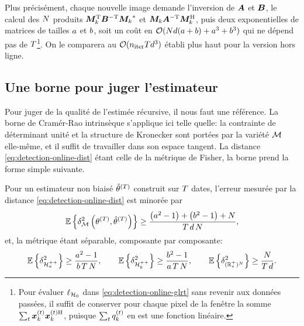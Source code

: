 Plus précisément, chaque nouvelle image demande l'inversion de $\boldsymbol{A}$ et $\boldsymbol{B}$, le calcul des $N$ produits $\boldsymbol{M}_k^{\mathrm{T}}\boldsymbol{B}^{-\mathrm{T}}{\boldsymbol{M}_k}^{*}$ et $\boldsymbol{M}_k\boldsymbol{A}^{-\mathrm{T}}\boldsymbol{M}_k^{\mathrm{H}}$, puis deux exponentielles de matrices de tailles $a$ et $b$, soit un coût en $\mathcal{O}(Nd(a+b)+a^3+b^3)$ qui ne dépend pas de $T$\footnote{Pour évaluer $\ell_{\mathcal{H}_0}$ dans \cref{eq:detection-online-glrt} sans revenir aux données passées, il suffit de conserver pour chaque pixel de la fenêtre la somme $\sum_{t}\boldsymbol{x}_k^{(t)}\boldsymbol{x}_k^{(t)\mathrm{H}}$, puisque $\sum_t q_k^{(t)}$ en est une fonction linéaire.}. On le comparera au $\mathcal{O}(n_{\mathrm{iter}}Td^3)$ établi plus haut pour la version hors ligne.

\subsection{Une borne pour juger l'estimateur}

Pour juger de la qualité de l'estimée récursive, il nous faut une référence. La borne de Cramér-Rao intrinsèque s'applique ici telle quelle: la contrainte de déterminant unité et la structure de Kronecker sont portées par la variété $\mathcal{M}$ elle-même, et il suffit de travailler dans son espace tangent. La distance \cref{eq:detection-online-dist} étant celle de la métrique de Fisher, la borne prend la forme simple suivante.

\begin{proposition}
\label{prop:detection-online-icrb}
  Pour un estimateur non biaisé $\hat{\theta}^{(T)}$ construit sur $T$ dates, l'erreur mesurée par la distance \cref{eq:detection-online-dist} est minorée par
  \begin{equation}
    \operatorname{\mathbb{E}}\left\{\delta^2_{\mathcal{M}}\left(\theta^{(T)},\hat{\theta}^{(T)}\right)\right\}
    \geq
    \frac{\left(a^2-1\right)+\left(b^2-1\right)+N}{T\,d\,N},
    \label{eq:detection-online-icrb}
  \end{equation}
  et, la métrique étant séparable, composante par composante:
  \begin{equation}
    \operatorname{\mathbb{E}}\left\{\delta^2_{\mathcal{H}_{a}^{++}}\right\} \geq \frac{a^2-1}{b\,T\,N},
    \qquad
    \operatorname{\mathbb{E}}\left\{\delta^2_{\mathcal{H}_{b}^{++}}\right\} \geq \frac{b^2-1}{a\,T\,N},
    \qquad
    \operatorname{\mathbb{E}}\left\{\delta^2_{(\mathbb{R}_*^+)^{N}}\right\} \geq \frac{N}{T\,d}.
    \label{eq:detection-online-icrb-composantes}
  \end{equation}
\end{proposition}

